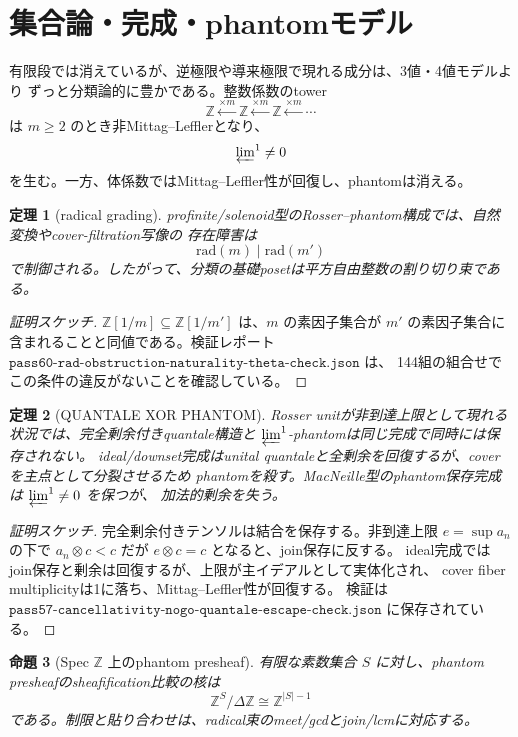 \documentclass[uplatex,dvipdfmx,a4paper,10pt]{jsarticle}
\newtheorem{theorem}{定理}
\newtheorem{proposition}[theorem]{命題}
\begin{document}
\section{集合論・完成・phantomモデル}

有限段では消えているが、逆極限や導来極限で現れる成分は、3値・4値モデルより
ずっと分類論的に豊かである。整数係数のtower
\[
\mathbb Z \xleftarrow{\times m} \mathbb Z
\xleftarrow{\times m} \mathbb Z
\xleftarrow{\times m}\cdots
\]
は \(m\ge2\) のとき非Mittag--Lefflerとなり、
\[
\varprojlim\nolimits^1\ne0
\]
を生む。一方、体係数ではMittag--Leffler性が回復し、phantomは消える。

\begin{theorem}[radical grading]
profinite/solenoid型のRosser--phantom構成では、自然変換やcover-filtration写像の
存在障害は
\[
\mathrm{rad}(m)\mid\mathrm{rad}(m')
\]
で制御される。したがって、分類の基礎posetは平方自由整数の割り切り束である。
\end{theorem}

\begin{proof}[証明スケッチ]
\(\mathbb Z[1/m]\subseteq\mathbb Z[1/m']\) は、\(m\) の素因子集合が
\(m'\) の素因子集合に含まれることと同値である。検証レポート
\(\texttt{pass60-rad-obstruction-naturality-theta-check.json}\) は、
144組の組合せでこの条件の違反がないことを確認している。
\end{proof}

\begin{theorem}[QUANTALE XOR PHANTOM]
Rosser unitが非到達上限として現れる状況では、完全剰余付きquantale構造と
\(\varprojlim^1\)-phantomは同じ完成で同時には保存されない。
ideal/downset完成はunital quantaleと全剰余を回復するが、coverを主点として分裂させるため
phantomを殺す。MacNeille型のphantom保存完成は \(\varprojlim^1\ne0\) を保つが、
加法的剰余を失う。
\end{theorem}

\begin{proof}[証明スケッチ]
完全剰余付きテンソルは結合を保存する。非到達上限 \(e=\sup a_n\) の下で
\(a_n\otimes c<c\) だが \(e\otimes c=c\) となると、join保存に反する。
ideal完成ではjoin保存と剰余は回復するが、上限が主イデアルとして実体化され、
cover fiber multiplicityは1に落ち、Mittag--Leffler性が回復する。
検証は \(\texttt{pass57-cancellativity-nogo-quantale-escape-check.json}\) に保存されている。
\end{proof}

\begin{proposition}[Spec \(\mathbb Z\) 上のphantom presheaf]
有限な素数集合 \(S\) に対し、phantom presheafのsheafification比較の核は
\[
\mathbb Z^S/\Delta\mathbb Z\cong\mathbb Z^{|S|-1}
\]
である。制限と貼り合わせは、radical束のmeet/gcdとjoin/lcmに対応する。
\end{proposition}
\end{document}
